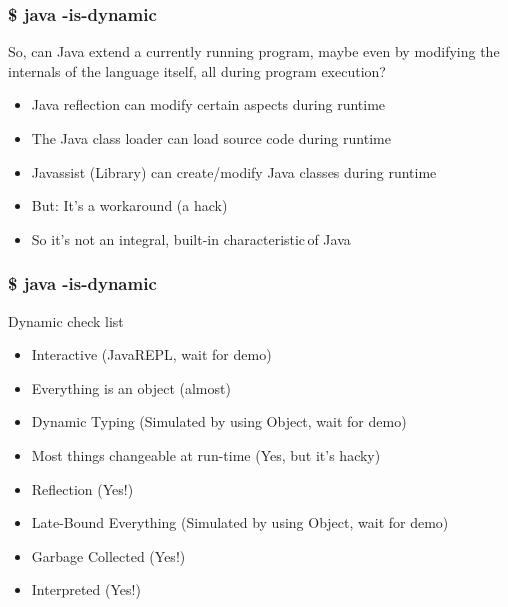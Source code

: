 \begin{frame}
  \frametitle{\$ java -is-dynamic}
  \center
  So, can Java \frqq extend a currently running program\flqq, maybe \frqq even by modifying the internals of the language itself, all during program execution\flqq ?

  \vspace{0.25cm}
  \begin{itemize}
    \item Java reflection can modify certain aspects during runtime
    \vspace{0.4cm} 
    \item The Java class loader can load source code during runtime
    \vspace{0.4cm}      
    \item Javassist (Library) can create/modify Java classes during runtime
    \vspace{0.4cm}    
    \item But: It's a workaround (a hack)
    \vspace{0.4cm}
    \item So it's not an \frqq integral, built-in characteristic\flqq\,of Java
  \end{itemize}
\end{frame}

\begin{frame}
  \frametitle{\$ java -is-dynamic}

  Dynamic check list
  \vspace{0.25cm}
  \begin{itemize}
    \item Interactive (JavaREPL, wait for demo)
    \vspace{0.4cm} 
    \item Everything is an object (almost)
    \vspace{0.4cm}      
    \item Dynamic Typing (Simulated by using Object, wait for demo)
    \vspace{0.4cm}    
    \item Most things changeable at run-time (Yes, but it's hacky)
    \vspace{0.4cm}
    \item Reflection (Yes!)
    \vspace{0.4cm}
    \item Late-Bound Everything (Simulated by using Object, wait for demo)
    \vspace{0.4cm}
    \item Garbage Collected (Yes!)
    \vspace{0.4cm}
    \item Interpreted (Yes!)
  \end{itemize}
\end{frame}

